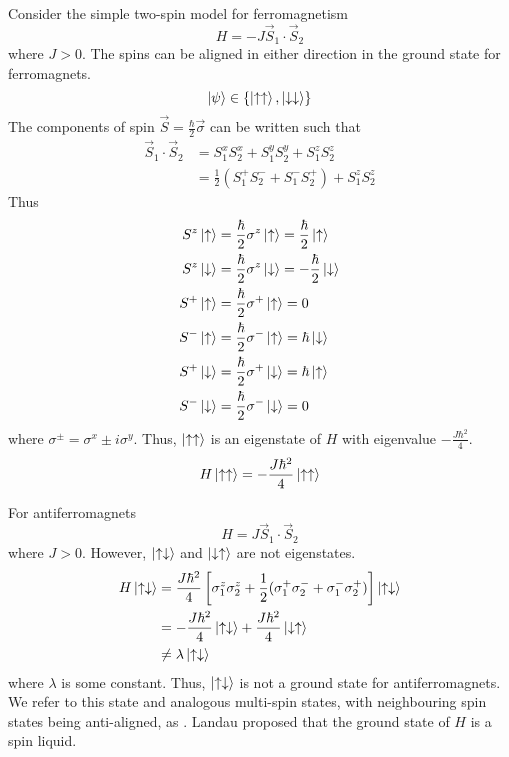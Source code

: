 \documentclass[12pt,a4paper,titlepage]{article}
\newcommand{\up}{\uparrow} %
\newcommand{\dn}{\downarrow} %
\newcommand{\ul}[1]{\underline{\smash{#1}}} %
\begin{document}
Consider the simple two-spin model for ferromagnetism
\begin{equation}
H=-J\vec{S}_{1}\cdot\vec{S}_{2}
\end{equation}
where $J>0$. The spins can be aligned in either direction in the ground state for ferromagnets.
\begin{equation}
\ket{\psi}\in\{\ket{\up\up},\ket{\dn\dn}\}
\end{equation}
The components of spin $\vec{S}=\frac{\hbar}{2}\vec{\sigma}$ can be written such that
\begin{equation}
\begin{aligned}
\vec{S}_{1}\cdot\vec{S}_{2}&=S_{1}^{x}S_{2}^{x}+S_{1}^{y}S_{2}^{y}+S_{1}^{z}S_{2}^{z}\\
&=\frac{1}{2}\left(S_{1}^{+}S_{2}^{-}+S_{1}^{-}S_{2}^{+}\right)+S_{1}^{z}S_{2}^{z}
\end{aligned}
\end{equation}
Thus
\begin{equation}
\begin{aligned}
S^{z}\ket{\up}&=\frac{\hbar}{2}\sigma^{z}\ket{\up}=\frac{\hbar}{2}\ket{\up}\\
S^{z}\ket{\dn}&=\frac{\hbar}{2}\sigma^{z}\ket{\dn}=-\frac{\hbar}{2}\ket{\dn}\\
S^{+}\ket{\up}&=\frac{\hbar}{2}\sigma^{+}\ket{\up}=0\\
S^{-}\ket{\up}&=\frac{\hbar}{2}\sigma^{-}\ket{\up}=\hbar\ket{\dn}\\
S^{+}\ket{\dn}&=\frac{\hbar}{2}\sigma^{+}\ket{\dn}=\hbar\ket{\up}\\
S^{-}\ket{\dn}&=\frac{\hbar}{2}\sigma^{-}\ket{\dn}=0
\end{aligned}
\end{equation}
where $\sigma^{\pm}=\sigma^{x}\pm i\sigma^{y}$. Thus, $\ket{\up\up}$ is an eigenstate of $H$ with eigenvalue $-\frac{J\hbar^{2}}{4}$.
\begin{equation}
H\ket{\up\up}=-\frac{J\hbar^{2}}{4}\ket{\up\up}
\end{equation}

For antiferromagnets
\begin{equation}
H=J\vec{S}_{1}\cdot\vec{S}_{2}
\end{equation}
where $J>0$. However, $\ket{\up\dn}$ and $\ket{\dn\up}$ are not eigenstates.
\begin{equation}
\begin{aligned}
H\ket{\up\dn}&=\frac{J\hbar^{2}}{4}\left[\sigma_{1}^{z}\sigma_{2}^{z}+\frac{1}{2}(\sigma_{1}^{+}\sigma_{2}^{-}+\sigma_{1}^{-}\sigma_{2}^{+})\right]\ket{\up\dn}\\
&=-\frac{J\hbar^{2}}{4}\ket{\up\dn}+\frac{J\hbar^{2}}{4}\ket{\dn\up}\\
&\neq \lambda\ket{\up\dn}
\end{aligned}
\end{equation}
where $\lambda$ is some constant. Thus, $\ket{\up\dn}$ is not a ground state for antiferromagnets. We refer to this state and analogous multi-spin states, with neighbouring spin states being anti-aligned, as \ul{N\'{e}el states}. Landau proposed that the ground state of $H$ is a spin liquid.\\
\end{document}
